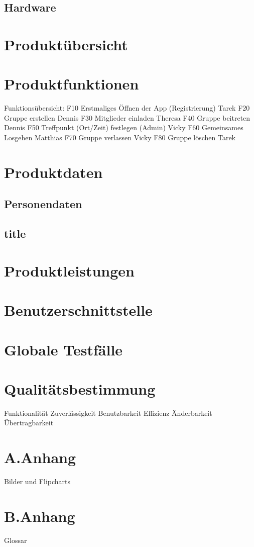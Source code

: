 \documentclass[parskip=full]{scrartcl}
\begin{document}
\subsection{Hardware}

\section{Produktübersicht}

\section{Produktfunktionen}
Funktionsübersicht:
F10 Erstmaliges Öffnen der App (Registrierung) Tarek
F20 Gruppe erstellen Dennis
F30 Mitglieder einladen Theresa
F40 Gruppe beitreten Dennis
F50 Treffpunkt (Ort/Zeit) festlegen (Admin) Vicky
F60 Gemeinsames Losgehen Matthias
F70 Gruppe verlassen Vicky
F80 Gruppe löschen Tarek

\section{Produktdaten}
\subsection{Personendaten}
\subsection{title}

\section{Produktleistungen}

\section{Benutzerschnittstelle}

\section{Globale Testfälle}

\section{Qualitätsbestimmung}
Funktionalität 
Zuverlässigkeit
Benutzbarkeit 
Effizienz 
Änderbarkeit 
Übertragbarkeit

\section{A.Anhang}
Bilder und Flipcharts

\section{B.Anhang}
Glossar
\end{document}
